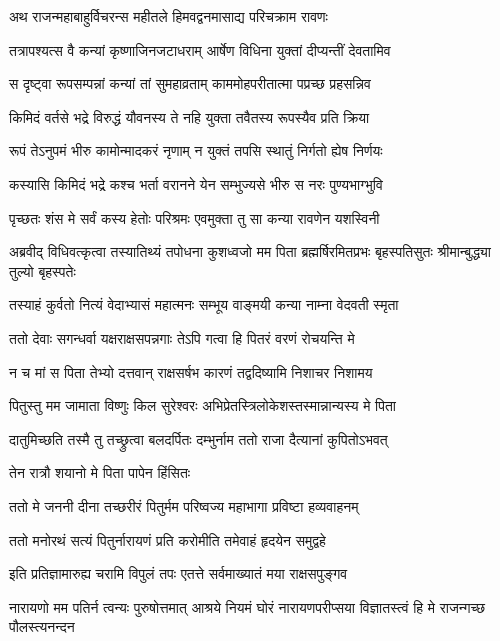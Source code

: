 
\twolineshloka
{अथ राजन्महाबाहुर्विचरन्स महीतले}
{हिमवद्वनमासाद्य परिचक्राम रावणः} %

\twolineshloka
{तत्रापश्यत्स वै कन्यां कृष्णाजिनजटाधराम्}
{आर्षेण विधिना युक्तां दीप्यन्तीं देवतामिव} %

\twolineshloka
{स दृष्ट्वा रूपसम्पन्नां कन्यां तां सुमहाव्रताम्}
{काममोहपरीतात्मा पप्रच्छ प्रहसन्निव} %

\twolineshloka
{किमिदं वर्तसे भद्रे विरुद्धं यौवनस्य ते}
{नहि युक्ता तवैतस्य रूपस्यैव प्रति क्रिया} %

\twolineshloka
{रूपं तेऽनुपमं भीरु कामोन्मादकरं नृणाम्}
{न युक्तं तपसि स्थातुं निर्गतो ह्येष निर्णयः} %

\twolineshloka
{कस्यासि किमिदं भद्रे कश्च भर्ता वरानने}
{येन सम्भुज्यसे भीरु स नरः पुण्यभाग्भुवि} %

\twolineshloka
{पृच्छतः शंस मे सर्वं कस्य हेतोः परिश्रमः}
{एवमुक्ता तु सा कन्या रावणेन यशस्विनी} %

\threelineshloka
{अब्रवीद् विधिवत्कृत्वा तस्यातिथ्यं तपोधना}
{कुशध्वजो मम पिता ब्रह्मर्षिरमितप्रभः}
{बृहस्पतिसुतः श्रीमान्बुद्ध्या तुल्यो बृहस्पतेः} %

\twolineshloka
{तस्याहं कुर्वतो नित्यं वेदाभ्यासं महात्मनः}
{सम्भूय वाङ्मयी कन्या नाम्ना वेदवती स्मृता} %

\twolineshloka
{ततो देवाः सगन्धर्वा यक्षराक्षसपन्नगाः}
{तेऽपि गत्वा हि पितरं वरणं रोचयन्ति मे} %

\twolineshloka
{न च मां स पिता तेभ्यो दत्तवान् राक्षसर्षभ}
{कारणं तद्वदिष्यामि निशाचर निशामय} %

\twolineshloka
{पितुस्तु मम जामाता विष्णुः किल सुरेश्वरः}
{अभिप्रेतस्त्रिलोकेशस्तस्मान्नान्यस्य मे पिता} %

\twolineshloka
{दातुमिच्छति तस्मै तु तच्छ्रुत्वा बलदर्पितः}
{दम्भुर्नाम ततो राजा दैत्यानां कुपितोऽभवत्} %

\onelineshloka
{तेन रात्रौ शयानो मे पिता पापेन हिंसितः} %

\twolineshloka
{ततो मे जननी दीना तच्छरीरं पितुर्मम}
{परिष्वज्य महाभागा प्रविष्टा हव्यवाहनम्} %

\twolineshloka
{ततो मनोरथं सत्यं पितुर्नारायणं प्रति}
{करोमीति तमेवाहं हृदयेन समुद्वहे} %

\twolineshloka
{इति प्रतिज्ञामारुह्य चरामि विपुलं तपः}
{एतत्ते सर्वमाख्यातं मया राक्षसपुङ्गव} %

\threelineshloka
{नारायणो मम पतिर्न त्वन्यः पुरुषोत्तमात्}
{आश्रये नियमं घोरं नारायणपरीप्सया}
{विज्ञातस्त्वं हि मे राजन्गच्छ पौलस्त्यनन्दन} %

